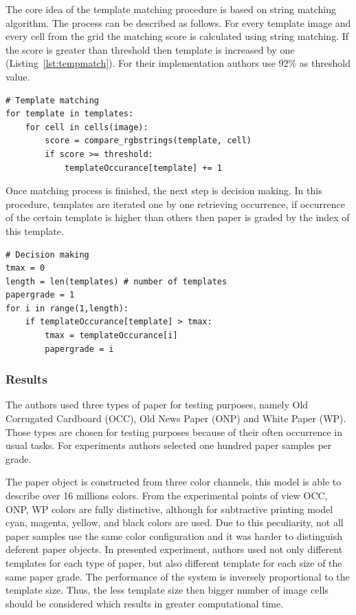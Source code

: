 \documentclass{lutmscthesis}[2010/09/22]
\begin{document}
The core idea of the template matching procedure is based
on string matching algorithm. The process can be described
as follows. For every template image and
every cell from the grid the matching score is calculated
using string matching. If the score is greater than
threshold then template is increased by one (Listing~\ref{lst:tempmatch}).
For their implementation authors use
92\% as threshold value.

\begin{lstlisting}[caption={Template Matching Procedure}, label={lst:tempmatch}]
# Template matching
for template in templates:
    for cell in cells(image):
        score = compare_rgbstrings(template, cell)
        if score >= threshold:
            templateOccurance[template] += 1
\end{lstlisting}

Once matching process is finished, the next step is decision
making. In this procedure, templates are iterated
one by one retrieving occurrence, if occurrence of the certain
template is higher than others then paper is graded by the
index of this template.

\begin{lstlisting}[caption={Decision Making Procedure}, label={lst:decision}]
# Decision making
tmax = 0
length = len(templates) # number of templates
papergrade = 1
for i in range(1,length):
    if templateOccurance[template] > tmax:
        tmax = templateOccurance[i]
        papergrade = i
\end{lstlisting}

\subsubsection*{ Results }
The authors used three types of paper for testing
purposes, namely Old Corrugated Cardboard (OCC),
Old News Paper (ONP) and White Paper (WP). Those
types are chosen for testing purposes because of
their often occurrence in usual tasks. For experiments
authors selected one hundred paper samples per grade.

The paper object is constructed from
three color channels, this model is able to describe
over 16 millions colors. From the experimental points
of view OCC, ONP, WP colors are fully distinctive,
although for subtractive printing model cyan, magenta,
yellow, and black colors are used. Due to this peculiarity,
not all paper samples use the same color configuration
and it was harder to distinguish deferent paper objects.
In presented experiment, authors used not only different
templates for each type of paper, but also different template
for each size of the same paper grade. The performance
of the system is inversely proportional to the template
size. Thus, the less template size then bigger number of
image cells should be considered which results
in greater computational time.
\end{document}
